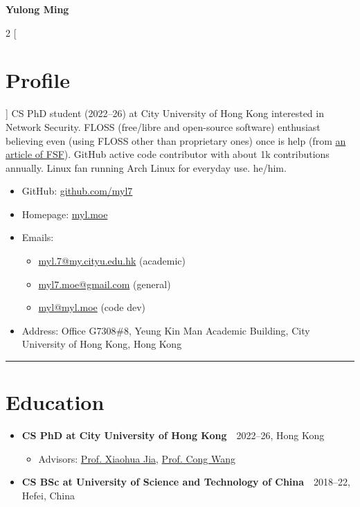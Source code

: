 \documentclass{article}
\begin{document}
\begin{center}
  {\huge \textbf{Yulong Ming}}
\end{center}

\begin{multicols}{2}
  [\section*{Profile}]
  CS PhD student (2022--26) at City University of Hong Kong interested in Network Security.
  FLOSS (free/libre and open-source software) enthusiast believing even (using FLOSS other than proprietary ones) once is help (from \href{https://www.gnu.org/philosophy/saying-no-even-once.html}{an article of FSF}).
  GitHub active code contributor with about 1k contributions annually.
  Linux fan running Arch Linux for everyday use.
  he/him.

  \begin{itemize}[itemsep=0cm,parsep=0cm]
    \item GitHub: \href{https://github.com/myl7}{github.com/myl7}
    \item Homepage: \href{https://myl.moe}{myl.moe}
    \item Emails:
    \begin{itemize}[itemsep=0cm,parsep=0cm,topsep=0cm,leftmargin=0.25cm,label=]
      \item \href{mailto:myl.7@my.cityu.edu.hk}{myl.7@my.cityu.edu.hk} (academic)
      \item \href{mailto:myl7.moe@gmail.com}{myl7.moe@gmail.com} (general)
      \item \href{mailto:myl@myl.moe}{myl@myl.moe} (code dev)
    \end{itemize}
    \item Address: Office G7308\#8, Yeung Kin Man Academic Building, City University of Hong Kong, Hong Kong
  \end{itemize}
\end{multicols}

\hrule

\section*{Education}
\begin{itemize}[parsep=0.1cm,leftmargin=0.4cm]
  \item \textbf{CS PhD at City University of Hong Kong}\ \dotfill\ 2022--26, Hong Kong
  \begin{itemize}[itemsep=0cm,parsep=0cm,topsep=0cm,leftmargin=0.25cm,label=]
    \item Advisors: \href{https://www.cs.cityu.edu.hk/~jia/}{Prof. Xiaohua Jia}, \href{https://www.cs.cityu.edu.hk/~congwang/}{Prof. Cong Wang}
  \end{itemize}
  \item \textbf{CS BSc at University of Science and Technology of China}\ \dotfill\ 2018--22, Hefei, China
\end{itemize}
\end{document}
